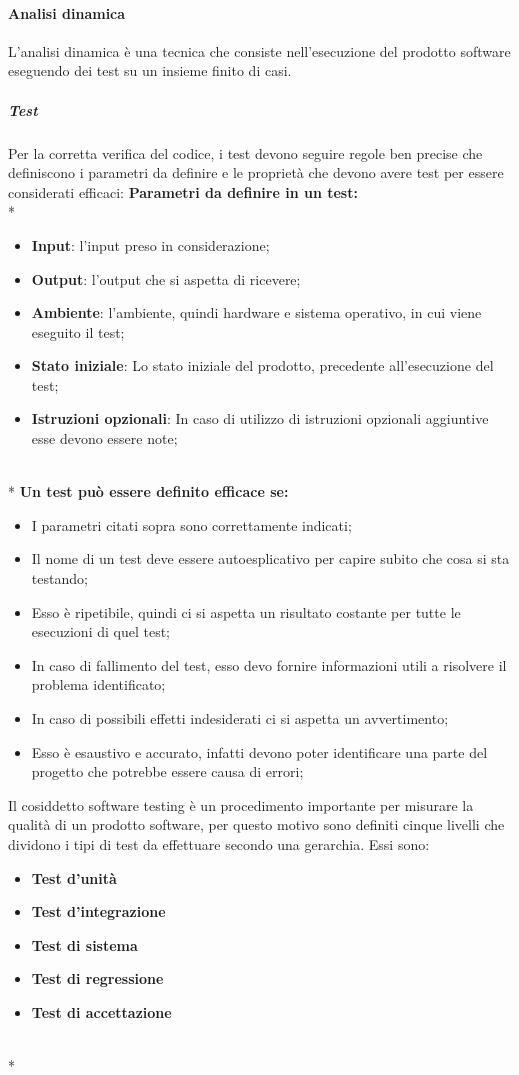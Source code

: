 		\paragraph{Analisi dinamica}
			L'analisi dinamica è una tecnica che consiste nell'esecuzione del prodotto software eseguendo dei test su un insieme finito di casi.
			\subparagraph{Test}
				Per la corretta verifica del codice, i test devono seguire regole ben precise che definiscono i parametri da definire e le proprietà che devono avere test per essere considerati efficaci:
				\textbf{Parametri da definire in un test:} \\*
				\begin{itemize}
					\item \textbf{Input}: l'input preso in considerazione;
					\item \textbf{Output}: l'output che si aspetta di ricevere;
					\item \textbf{Ambiente}: l'ambiente, quindi hardware e sistema operativo, in cui viene eseguito il test;
					\item \textbf{Stato iniziale}: Lo stato iniziale del prodotto, precedente all'esecuzione del test;
					\item \textbf{Istruzioni opzionali}: In caso di utilizzo di istruzioni opzionali aggiuntive esse devono essere note;
				\end{itemize} \\*
				\textbf{Un test può essere definito efficace se:}
				\begin{itemize}
					\item I parametri citati sopra sono correttamente indicati;
					\item Il nome di un test deve essere autoesplicativo per capire subito che cosa si sta testando;
					\item Esso è ripetibile, quindi ci si aspetta un risultato costante per tutte le esecuzioni di quel test;
					\item In caso di fallimento del test, esso devo fornire informazioni utili a risolvere il problema identificato;
					\item In caso di possibili effetti indesiderati ci si aspetta un avvertimento;
					\item Esso è esaustivo e accurato, infatti devono poter identificare una parte del progetto che potrebbe essere causa di errori;
				\end{itemize}
				Il cosiddetto software testing è un procedimento importante per misurare la qualità di un prodotto software, per questo motivo sono definiti cinque livelli che dividono i tipi di test da effettuare secondo una gerarchia. Essi sono: 
				\begin{itemize}
					\item \textbf{Test d'unità}
					\item \textbf{Test d'integrazione}
					\item \textbf{Test di sistema}
					\item \textbf{Test di regressione}
					\item \textbf{Test di accettazione}
				\end{itemize} \\*
				
